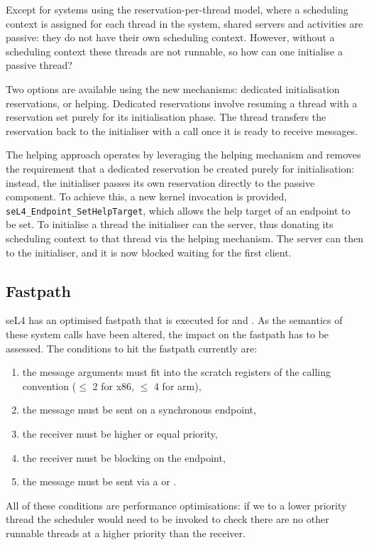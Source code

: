 Except for systems using the reservation-per-thread model, where a scheduling context is assigned for each thread in the system, shared servers and activities are passive: they do not have their own scheduling context.
However, without a scheduling context these threads are not runnable, so how can one initialise a passive thread?

Two options are available using the new mechanisms: dedicated initialisation reservations, or helping.
Dedicated reservations involve resuming a thread with a reservation set purely for its initialisation phase.
The thread transfers the reservation back to the initialiser with a \sendwait call once it is ready to receive messages.

The helping approach operates by leveraging the helping mechanism and removes the requirement that a dedicated reservation be created purely for initialisation: instead, the initialiser passes its own reservation directly to the passive component.
To achieve this, a new kernel invocation is provided, \texttt{seL4\_Endpoint\_SetHelpTarget}, which allows the help target of an endpoint to be set.
To initialise a thread the initialiser can \call the server, thus donating its scheduling context to that thread via the helping mechanism.
The server can then \replywait to the initialiser, and it is now blocked waiting for the first client.

\subsection{Fastpath}

seL4 has an optimised fastpath that is executed for \call and \replywait.
As the semantics of these system calls have been altered, the impact on the fastpath has to be assessed.
The conditions to hit the fastpath currently are:
\begin{enumerate}
    \item the message arguments must fit into the scratch registers of the calling convention ($\leq$ 2 for x86, $\leq$ 4 for arm),
    \item the message must be sent on a synchronous endpoint,
    \item the receiver must be higher or equal priority,
    \item the receiver must be blocking on the endpoint,
    \item the message must be sent via a \call or \replywait.
\end{enumerate}
All of these conditions are performance optimisations: if we \call to a lower priority thread the scheduler would need to be invoked to check there are no other runnable threads at a higher priority than the receiver.


